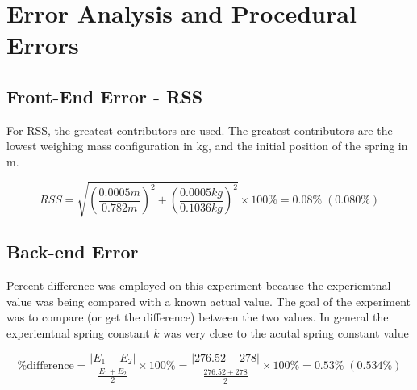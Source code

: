 \chapter{Error Analysis and Procedural Errors}

\section{Front-End Error - RSS}

For RSS, the greatest contributors are used. The greatest contributors are 
the lowest weighing mass configuration in kg, and the initial position of 
the spring in m.
  
  \begin{equation*}
    RSS = \sqrt{\left( \frac{0.0005m}{0.782m} \right)^2 + \left( \frac{0.0005kg}{0.1036kg} \right)^2} \times 100\% = 0.08\% \; (0.080\%)
  \end{equation*}

\section{Back-end Error}

Percent difference was employed on this experiment because the experiemtnal value was 
being compared with a known actual value. The goal of the experiment was to compare (or
get the difference) between the two values. In general the experiemtnal spring constant $k$
was very close to the acutal spring constant value

\begin{equation*}
  \%\text{difference}= \frac{|E_1 - E_2|}{\frac{E_1 + E_2}{2}} \times 100\% = 
  \frac{|276.52 - 278|}{\frac{276.52 + 278}{2}} \times 100\% = 0.53\% \; (0.534\%)
\end{equation*}

